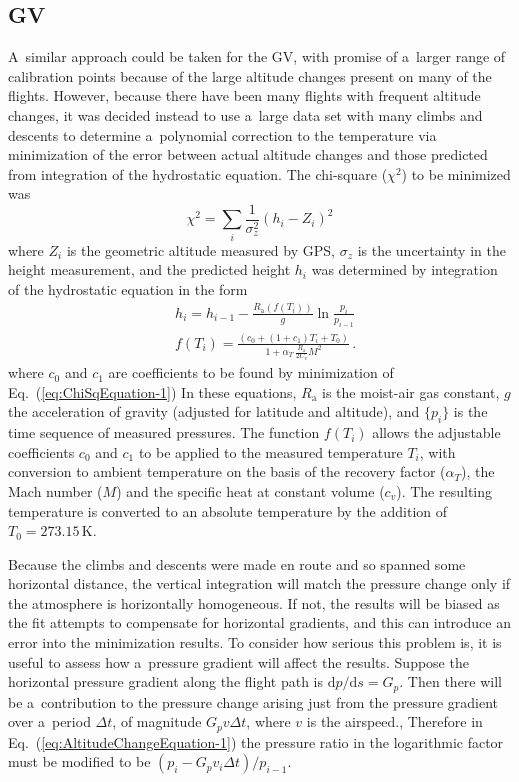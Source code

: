 \documentclass[amtd, online, hvmath]{copernicus}
\begin{document}
\subsection{GV}

A~similar approach could be taken for the GV, with promise of a~larger
range of calibration points because of the large altitude changes
present on many of the flights. However, because there have been many
flights with frequent altitude changes, it was decided instead to use
a~large data set with many climbs and descents to determine
a~polynomial correction to the temperature via minimization of the
error between actual altitude changes and those predicted from
integration of the hydrostatic equation. The chi-square ($\chi^2$) to
be minimized was
\begin{equation}
\chi^2=\sum\limits_i\frac{1}{\sigma_z^2}(h_i-Z_i)^2\label{eq:ChiSqEquation-1}
\end{equation}
where $Z_i$ is the geometric altitude measured by GPS, $\sigma_z$
is the uncertainty in the height measurement, and the predicted height
$h_i$ was determined by integration of the hydrostatic equation
in the form
\begin{align}
&h_i=h_{i-1}-\frac{R_{\mathrm{a}}(f(T_i))}{g}\ln\frac{p_i}{p_{i-1}}\label{eq:AltitudeChangeEquation-1}\\
&f(T_i)=\frac{\left(c_0+(1+c_1)T_i+T_0\right)}{1+\alpha_T\,\frac{R_{\mathrm{a}}}{2C_v}M^2}\,.\label{eq:RecoveryCorrection}
\end{align}
where $c_0$ and $c_1$ are coefficients to be found by minimization of
Eq.~(\ref{eq:ChiSqEquation-1}) In these equations, $R_{\mathrm{a}}$
is the moist-air gas constant, $g$ the acceleration of gravity
(adjusted for latitude and altitude), and $\{p_i\}$ is the time
sequence of measured pressures. The function $f(T_i)$ allows the
adjustable coefficients $c_0$ and $c_1$ to be applied to the measured
temperature $T_i$, with conversion to ambient temperature on the basis
of the recovery factor ($\alpha_T$), the Mach number ($M$)
and the specific heat at constant volume ($c_v$). The resulting
temperature is converted to an absolute temperature by the addition of
$T_0=273.15$\,\unit{K}.

Because the climbs and descents were made en route and so spanned some
horizontal distance, the vertical integration will match the pressure
change only if the atmosphere is horizontally homogeneous.  If not,
the results will be biased as the fit attempts to compensate for
horizontal gradients, and this can introduce an error into the
minimization results. To consider how serious this problem is, it is
useful to assess how a~pressure gradient will affect the results.
Suppose the horizontal pressure gradient along the flight path is
$\mathrm{d}p/\mathrm{d}s=G_p$. Then there will be a~contribution to the
pressure change arising just from the pressure gradient over a~period
$\Delta t$, of magnitude $G_pv\Delta t$, where $v$ is the
airspeed., Therefore in Eq.~(\ref{eq:AltitudeChangeEquation-1}) the
pressure ratio in the logarithmic factor must be modified to be
$(p_i-G_pv_i\Delta t)/p_{i-1}$.
\end{document}

